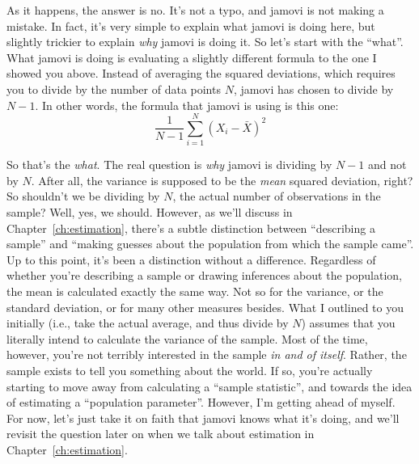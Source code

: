 As it happens, the answer is no. It's not a typo, and jamovi is not making a mistake. In fact, it's very simple to explain what jamovi is doing here, but slightly trickier to explain {\it why} jamovi is doing it. So let's start with the ``what''. What jamovi is doing is evaluating a slightly different formula to the one I showed you above. Instead of averaging the squared deviations, which requires you to divide by the number of data points $N$, jamovi has chosen to divide by $N-1$. In other words, the formula that jamovi is using is this one:
$$
\frac{1}{N-1} \sum_{i=1}^N \left( X_i - \bar{X} \right)^2
$$

 So that's the {\it what}. The real question is {\it why} jamovi is dividing by $N-1$ and not by $N$. After all, the variance is supposed to be the {\it mean} squared deviation, right? So shouldn't we be dividing by $N$, the actual number of observations in the sample? Well, yes, we should. However, as we'll discuss in Chapter~\ref{ch:estimation}, there's a subtle distinction between ``describing a sample'' and ``making guesses about the population from which the sample came''. Up to this point, it's been a distinction without a difference. Regardless of whether you're describing a sample or drawing inferences about the population, the mean is calculated exactly the same way. Not so for the variance, or the standard deviation, or for many other measures besides. What I outlined to you initially (i.e., take the actual average, and thus divide by $N$) assumes that you literally intend to calculate the variance of the sample. Most of the time, however, you're not terribly interested in the sample {\it in and of itself}. Rather, the sample exists to tell you something about the world. If so, you're actually starting to move away from calculating a ``sample statistic'', and towards the idea of estimating a ``population parameter''. However, I'm getting ahead of myself. For now, let's just take it on faith that jamovi knows what it's doing, and we'll revisit the question later on when we talk about estimation in Chapter~\ref{ch:estimation}. 

